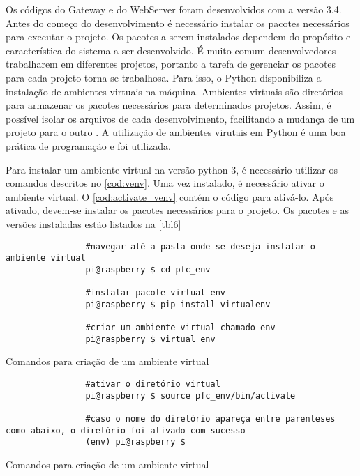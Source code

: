 			Os códigos do Gateway e do WebServer foram desenvolvidos com a versão 3.4. Antes do começo do desenvolvimento é necessário instalar os pacotes necessários para executar o projeto. Os pacotes a serem instalados dependem do propósito e característica do sistema a ser desenvolvido. É muito comum desenvolvedores trabalharem em diferentes projetos, portanto a tarefa de gerenciar os pacotes para cada projeto torna-se trabalhosa. Para isso, o Python disponibiliza a instalação de ambientes virtuais na máquina. Ambientes virtuais são diretórios para armazenar os pacotes necessários para determinados projetos. Assim, é possível isolar os arquivos de cada desenvolvimento, facilitando a mudança de um projeto para o outro \cite{kyle2017}. A utilização de ambientes virutais em Python é uma boa prática de programação e foi utilizada.
			
			Para instalar um ambiente virtual na versão python 3, é necessário utilizar os comandos descritos no \autoref{cod:venv}. Uma vez instalado, é necessário ativar o ambiente virtual. O  \autoref{cod:activate_venv} contém o código para ativá-lo. Após ativado, devem-se instalar os pacotes necessários para o projeto.  Os pacotes e as versões instaladas estão listados na \autoref{tbl6}
			
			\begin{listing}[!htb]
				\begin{verbatim}
				#navegar até a pasta onde se deseja instalar o ambiente virtual
				pi@raspberry $ cd pfc_env
				
				#instalar pacote virtual env
				pi@raspberry $ pip install virtualenv
				
				#criar um ambiente virtual chamado env
				pi@raspberry $ virtual env			
				\end{verbatim}
				\caption{Comandos para criação de um ambiente virtual}
			\label{cod:venv}
			\end{listing}
		
			\begin{listing}[!htb]
				\begin{verbatim}
				#ativar o diretório virtual
				pi@raspberry $ source pfc_env/bin/activate
				
				#caso o nome do diretório apareça entre parenteses como abaixo, o diretório foi ativado com sucesso
				(env) pi@raspberry $ 		
				\end{verbatim}
				\caption{Comandos para criação de um ambiente virtual}
				\label{cod:activate_venv}
			\end{listing}

